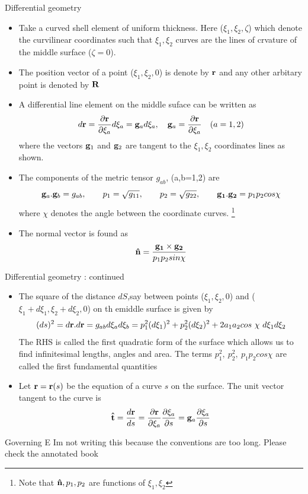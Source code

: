 	\begin{frame}{Differential geometry}
		\begin{itemize}
			\item Take a curved shell element of uniform thickness. Here ($\xi_1,\xi_2,\zeta$) which denote the curvilinear coordinates such that $\xi_1, \xi_2$ curves are the lines of crvature of the middle surface ($\zeta = 0$). 
			\item The position vector of a point ($\xi_1,\xi_2,0$) is denote by $\mathbf{r}$ and any other arbitary point is denoted by $\mathbf{R}$
			\item A differential line element on the middle suface can be written as 
			\begin{equation}
			d\mathbf{r} = \frac{\partial \mathbf{r}}{\partial \xi_a}d\xi_a = \mathbf{g}_a d\xi_a , \quad \mathbf{g}_a = \frac{\partial \mathbf{r}}{\partial \xi_a} \quad (a =1,2)
			\end{equation}
			where the vectors $\mathbf{g}_1$ and $\mathbf{g}_2$ are tangent to the $\xi_1,\xi_2$ coordinates lines as shown.
			\item  The components of the metric tensor $g_{ab}$, (a,b=1,2) are 
			\begin{equation}
			\mathbf{g}_a.\mathbf{g}_b = g_{ab},  \qquad p_1 = \sqrt{g_{11}}, \qquad p_2 = \sqrt{g_{22}}, \qquad \mathbf{g_1.g_2} = p_1p_2cos \chi
			\end{equation}
			where $\chi$ denotes the angle between the coordinate curves. \footnote{Note that $\mathbf{\hat{n}},p_1,p_2$ are functions of $\xi_1,\xi_2$}
			\item The normal vector is found as
			\begin{equation}
			\mathbf{\hat{n}} = \frac{\mathbf{g_1 \times g_2}}{p_1p_2sin \chi}
			\end{equation}
		\end{itemize}	
	\end{frame}


	\begin{frame}{Differential geometry : continued}
		\begin{itemize}
			\item The square of the distance $dS$,say between points ($\xi_1,\xi_2,0$) and ($\xi_1 + d\xi_1,\xi_2+d\xi_2,0$) on th emiddle surface is given by
			\begin{equation}
			 (ds)^2 = d\mathbf{r}. d\mathbf{r} = g_{ab}d\xi_a d\xi_b = p_1^2(d\xi_1)^2 + p_2^2(d\xi_2)^2 + 2a_1a_2cos~\chi~d\xi_1 d\xi_2
			\end{equation}
			The RHS is called the first quadratic form of the surface which allows us to find infinitesimal lengths, angles and area. The terms $p_1^2,~p_2^2,~p_1p_2cos\chi$ are called the first fundamental quantities
			\item Let $\mathbf{r}= \mathbf{r}(s)$ be the equation of a curve $s$ on the surface. The unit vector tangent to the curve is
			\begin{equation}
				\mathbf{\hat{t}} =  \frac{d \mathbf{r}}{d   s} = \frac{\partial \mathbf{r}}{\partial \xi_a} \frac{\partial \xi_a}{\partial s} = \mathbf{g}_a \frac{\partial \xi_a}{\partial s}
			\end{equation}			
		\end{itemize}
	\end{frame}


	\begin{frame}{Governing E}
		Im not writing this because the conventions are too long. Please check the annotated book
	\end{frame}